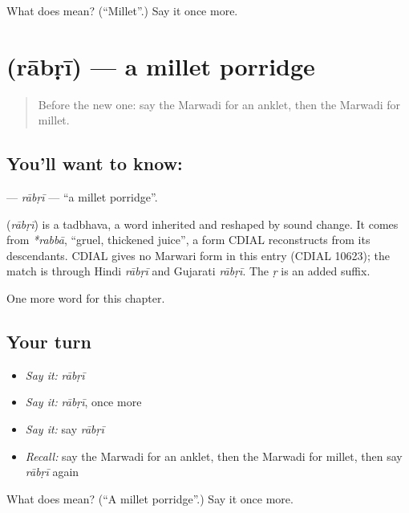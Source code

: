 \begin{tcolorbox}[breakable,colback=teal!4,colframe=teal!35!black,title={Before you move on}]
What does  mean? (\textquotedblleft{}Millet\textquotedblright{}.) Say it once more.
\end{tcolorbox}
\section[\texorpdfstring{\mw{राबड़ी} (rābṛī)}{राबड़ी (rābṛī)}]{ (rābṛī) — a millet porridge}

\label{lesson:MW-C130-rabri}



\begin{quote}
Before the new one: say the Marwadi for an anklet, then the Marwadi for millet.
\end{quote}

\subsection*{You'll want to know: }
\textbf{} — \emph{rābṛī} — \textquotedblleft{}a millet porridge\textquotedblright{}.

\begin{cousinweb}
\textbf{} (\emph{rābṛī}) is a tadbhava, a word inherited and reshaped by sound change. It comes from \emph{*rabbā}, \textquotedblleft{}gruel, thickened juice\textquotedblright{}, a form CDIAL reconstructs from its descendants. CDIAL gives no Marwari form in this entry (CDIAL 10623); the match is through Hindi \emph{rābṛī} and Gujarati \emph{rābṛī}. The \emph{ṛ} is an added suffix.
\end{cousinweb}

\begin{grammarlens}[title={What you've built}]
One more word for this chapter.
\end{grammarlens}

\subsection*{Your turn}
\begin{itemize}
\raggedright
  \item \emph{Say it:} \emph{rābṛī}
  \item \emph{Say it:} \emph{rābṛī}, once more
  \item \emph{Say it:} say \emph{rābṛī}
  \item \emph{Recall:} say the Marwadi for an anklet, then the Marwadi for millet, then say \emph{rābṛī} again
\end{itemize}

\begin{tcolorbox}[breakable,colback=teal!4,colframe=teal!35!black,title={Before you move on}]
What does  mean? (\textquotedblleft{}A millet porridge\textquotedblright{}.) Say it once more.
\end{tcolorbox}
